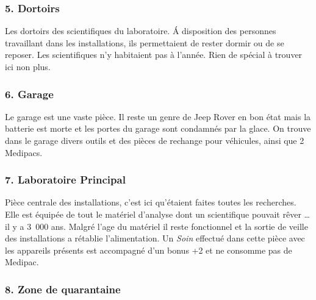 \subsubsection{5. Dortoirs}
Les dortoirs des scientifiques du laboratoire. \'A disposition des personnes travaillant dans les installations, ils permettaient de rester dormir ou de se reposer. Les scientifiques n’y habitaient pas à l’année. Rien de spécial à trouver ici non plus.

\subsubsection{6. Garage}
Le garage est une vaste pièce. Il reste un genre de Jeep Rover en bon état mais la batterie est morte et les portes du garage sont condamnés par la glace. On trouve dans le garage divers outils et des pièces de rechange pour véhicules, ainsi que 2 Medipacs.

\subsubsection{7. Laboratoire Principal}
Pièce centrale des installations, c’est ici qu’étaient faites toutes les recherches. Elle est équipée de tout le matériel d’analyse dont un scientifique pouvait rêver \ldots il y a 3~000 ans. Malgré l’age du matériel il reste fonctionnel et la sortie de veille des installations a rétablie l’alimentation. Un \textit{Soin} effectué dans cette pièce avec les appareils présents est accompagné d’un bonus +2 et ne consomme pas de Medipac.

\subsubsection{8. Zone de quarantaine}

